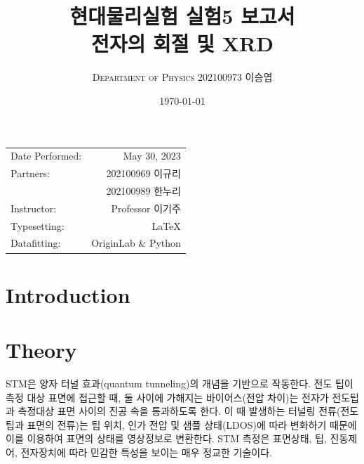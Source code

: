 \documentclass[a4paper, 10pt, nanum]{CSUniSchoolLabReport}
\title{현대물리실험 실험5 보고서 \\ 전자의 회절 및 XRD} %
\author{\textsc{Department of Physics} 202100973 이승엽}
\date{\today}
\begin{document}
\maketitle %

\begin{center}
	\begin{tabular}{l r}
		Date Performed: & May 30, 2023 \\ %
		Partners: & 202100969 이규리 \\ %
		& 202100989 한누리 \\
		Instructor: & Professor 이기주 \\ %
		Typesetting: & LaTeX \\
		Datafitting: & OriginLab \& Python \\
	\end{tabular}
\end{center}


\maketitle


\section{Introduction}





\section{Theory}

	STM은 양자 터널 효과(quantum tunneling)의 개념을 기반으로 작동한다. 전도 팁이 측정 대상 표면에 접근할 때, 둘 사이에 가해지는 바이어스(전압 차이)는 전자가 전도팁과 측정대상 표면 사이의 진공 속을 통과하도록 한다. 이 때 발생하는 터널링 전류(전도팁과 표면의 전류)는 팁 위치, 인가 전압 및 샘플 상태(LDOS)에 따라 변화하기 때문에 이를 이용하여 표면의 상태를 영상정보로 변환한다. STM 측정은 표면상태, 팁, 진동제어, 전자장치에 따라 민감한 특성을 보이는 매우 정교한 기술이다.
\end{document}
